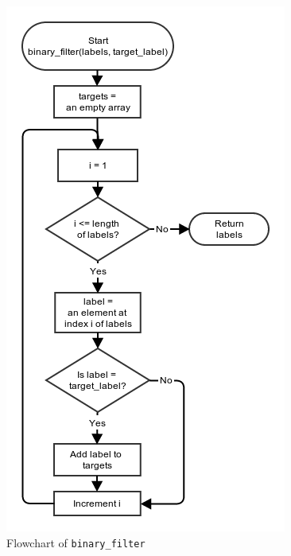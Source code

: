 \documentclass[10pt,a4paper]{article}
\begin{document}
\begin{figure}[!ht]
	\centering
	\includegraphics[scale=0.66]{images/flow_chart/binary_filter.png}
	\caption{Flowchart of \tt{binary\_filter}}
	\label{fig:binary_filter}
\end{figure}
\end{document}
